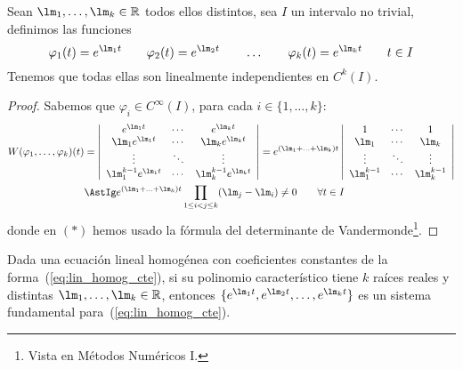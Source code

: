 \begin{observacion}
    Sean $\lm_1,\ldots,\lm_k\in \mathbb{R}$ todos ellos distintos, sea $I$ un intervalo no trivial, definimos las funciones
    \begin{equation*}
        \varphi_1(t) = e^{\lm_1 t} \qquad \varphi_2(t) = e^{\lm_2 t} \qquad \ldots \qquad \varphi_k(t) = e^{\lm_k t} \qquad t\in I
    \end{equation*}
    Tenemos que todas ellas son linealmente independientes en $C^k(I)$.
    \begin{proof}
        Sabemos que $\varphi_i \in C^\infty(I)$, para cada $i \in \{1,\ldots,k\}$:
        \begin{align*}
            W(\varphi_1,\ldots,\varphi_k)(t) &= 
            \left|\begin{array}{ccc}
                e^{\lm_1 t} & \cdots & e^{\lm_k t} \\
                \lm_1e^{\lm_1 t} & \cdots & \lm_ke^{\lm_k t} \\
                \vdots & \ddots & \vdots \\
                \lm_1^{k-1}e^{\lm_1 t} & \cdots & \lm_k^{k-1}e^{\lm_k t} 
            \end{array}\right| = e^{(\lm_1+\ldots+\lm_k)t}
            \left|\begin{array}{ccc}
                1 & \cdots & 1 \\
                \lm_1 & \cdots & \lm_k \\
                \vdots & \ddots & \vdots \\
                \lm_1^{k-1} & \cdots & \lm_k^{k-1} 
            \end{array}\right| \\
                                             &\AstIg e^{(\lm_1+\ldots+\lm_k)t} \prod_{1\leq i<j \leq k} (\lm_j-\lm_i) \neq 0 \qquad \forall t\in I
        \end{align*}
        donde en $(\ast)$ hemos usado la fórmula del determinante de Vandermonde\footnote{Vista en Métodos Numéricos I.}.
    \end{proof}
\end{observacion}

\begin{observacion}
    Dada una ecuación lineal homogénea con coeficientes constantes de la forma~(\ref{eq:lin_homog_cte}), si su polinomio característico tiene $k$ raíces reales y distintas ${\lm_1,\ldots,\lm_k \in \mathbb{R}}$, entonces $\{e^{\lm_1 t}, e^{\lm_2 t}, \ldots, e^{\lm_k t}\}$ es un sistema fundamental para~(\ref{eq:lin_homog_cte}).
\end{observacion}

